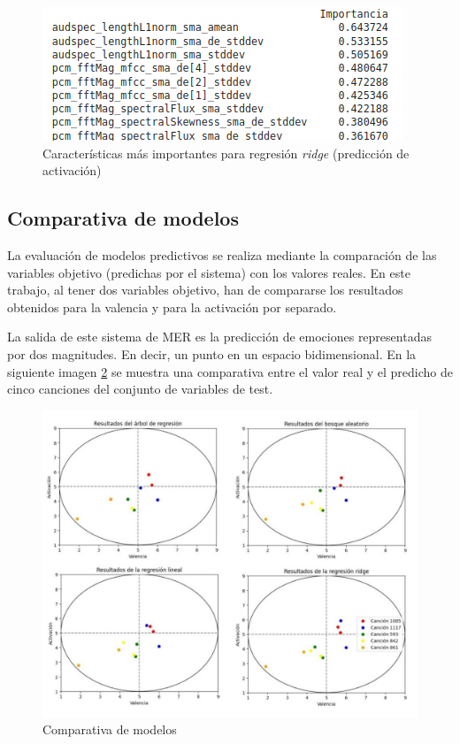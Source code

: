 \documentclass[12pt,a4paper]{article}
\begin{document}
\begin{figure}[H]
	\centering
	\includegraphics[width=0.7\linewidth]{figs/import_ridge_ar}
	\caption{Características más importantes para regresión \textit{ridge} (predicción de activación)}
	\label{fig:importridgear}
\end{figure}
	


\subsection{Comparativa de modelos}
La evaluación de modelos predictivos se realiza mediante la comparación de las variables objetivo (predichas por el sistema) con los valores reales. En este trabajo, al tener dos variables objetivo, han de compararse los resultados obtenidos para la valencia y para la activación por separado.

La salida de este sistema de MER es la predicción de emociones representadas por dos magnitudes. En decir, un punto en un espacio bidimensional. En la siguiente imagen \ref{fig:results} se muestra una comparativa entre el valor real y el predicho de cinco canciones del conjunto de variables de test. 
\begin{figure}[H]
	\centering
	\includegraphics[width=1\linewidth]{figs/results}
	\caption{Comparativa de modelos}
	\label{fig:results}
\end{figure}
\end{document}

